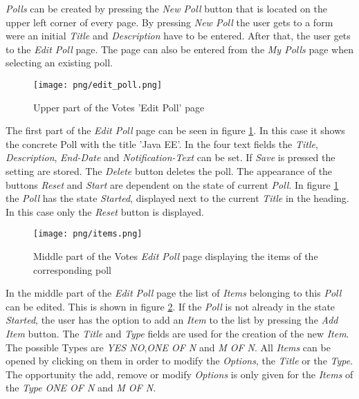 \textit{Polls} can be created by pressing the \textit{New Poll} button that is located on the upper left corner of every page. By pressing \textit{New Poll} the user gets to a form were an initial \textit{Title} and \textit{Description} have to be entered. After that, the user gets to the \textit{Edit Poll} page. The page can also be entered from the \textit{My Polls} page when selecting an existing poll.

\begin{figure}
\centering
\texttt{[image: png/edit\_poll.png]}
\caption{Upper part of the Votes 'Edit Poll' page}
\label{F:edit_poll}
\end{figure}

The first part of the \textit{Edit Poll} page can be seen in figure \ref{F:edit_poll}. In this case it shows the concrete Poll with the title 'Java EE'. In the four text fields the \textit{Title}, \textit{Description}, \textit{End-Date} and \textit{Notification-Text} can be set. If \textit{Save} is pressed the setting are stored. The \textit{Delete} button deletes the poll. The appearance of the buttons \textit{Reset} and \textit{Start} are dependent on the state of current \textit{Poll}. In figure \ref{F:edit_poll} the \textit{Poll} has the state \textit{Started}, displayed next to the current \textit{Title} in the heading. In this case only the \textit{Reset} button is displayed.  

\begin{figure}
\centering
\texttt{[image: png/items.png]}
\caption{Middle part of the Votes \textit{Edit Poll} page displaying the items of the corresponding poll}
\label{F:items}
\end{figure}

In the middle part of the \textit{Edit Poll} page the list of \textit{Items} belonging to this \textit{Poll} can be edited. This is shown in figure \ref*{F:items}. If the \textit{Poll} is not already in the state \textit{Started}, the user has the option to add an \textit{Item} to the list by pressing the \textit{Add Item} button. The \textit{Title} and \textit{Type} fields are used for the creation of the new \textit{Item}. The possible Types are \textit{YES NO},\textit{ONE OF N} and \textit{M OF N}. All \textit{Items} can be opened by clicking on them in order to modify the \textit{Options}, the \textit{Title} or the \textit{Type}. The opportunity the add, remove or modify \textit{Options} is only given for the \textit{Items} of the \textit{Type} \textit{ONE OF N} and \textit{M OF N}.

